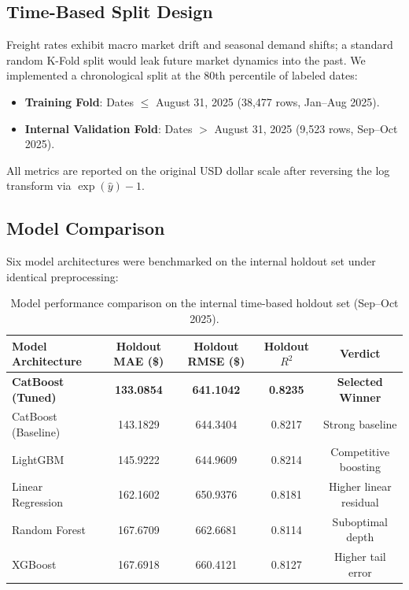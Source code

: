 \documentclass[11pt,a4paper]{article}
\begin{document}
\subsection{Time-Based Split Design}
Freight rates exhibit macro market drift and seasonal demand shifts; a standard random K-Fold split would leak future market dynamics into the past. We implemented a chronological split at the 80th percentile of labeled dates:
\begin{itemize}
    \item \textbf{Training Fold}: Dates $\le$ August 31, 2025 (38,477 rows, Jan–Aug 2025).
    \item \textbf{Internal Validation Fold}: Dates $>$ August 31, 2025 (9,523 rows, Sep–Oct 2025).
\end{itemize}
All metrics are reported on the original USD dollar scale after reversing the log transform via $\exp(\hat{y}) - 1$.

\subsection{Model Comparison}
Six model architectures were benchmarked on the internal holdout set under identical preprocessing:

\begin{table}[H]
\centering
\small
\renewcommand{\arraystretch}{1.15}
\begin{tabular}{lcccc}
\toprule
\textbf{Model Architecture} & \textbf{Holdout MAE (\$)} & \textbf{Holdout RMSE (\$)} & \textbf{Holdout $R^2$} & \textbf{Verdict} \\
\midrule
\textbf{CatBoost (Tuned)} & \textbf{133.0854} & \textbf{641.1042} & \textbf{0.8235} & \textbf{Selected Winner} \\
CatBoost (Baseline) & 143.1829 & 644.3404 & 0.8217 & Strong baseline \\
LightGBM & 145.9222 & 644.9609 & 0.8214 & Competitive boosting \\
Linear Regression & 162.1602 & 650.9376 & 0.8181 & Higher linear residual \\
Random Forest & 167.6709 & 662.6681 & 0.8114 & Suboptimal depth \\
XGBoost & 167.6918 & 660.4121 & 0.8127 & Higher tail error \\
\bottomrule
\end{tabular}
\caption{Model performance comparison on the internal time-based holdout set (Sep--Oct 2025).}
\end{table}
\end{document}
